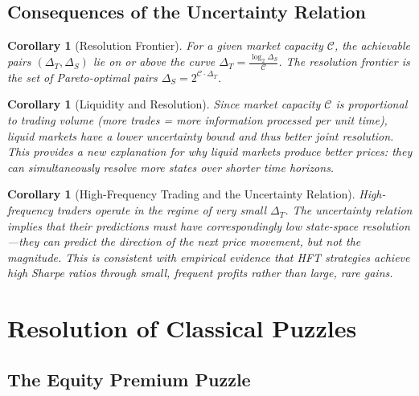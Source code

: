 \documentclass[12pt,a4paper]{article}
\newtheorem{corollary}[theorem]{Corollary}
\theoremstyle{definition}
\begin{document}
\subsection{Consequences of the Uncertainty Relation}

\begin{corollary}[Resolution Frontier]\label{cor:resolution_frontier}
For a given market capacity $\mathcal{C}$, the achievable pairs $(\Delta_T, \Delta_S)$ lie on or above the curve $\Delta_T = \frac{\log_2 \Delta_S}{\mathcal{C}}$. The \emph{resolution frontier} is the set of Pareto-optimal pairs $\Delta_S = 2^{\mathcal{C} \cdot \Delta_T}$.
\end{corollary}

\begin{corollary}[Liquidity and Resolution]\label{cor:liq_resolution}
Since market capacity $\mathcal{C}$ is proportional to trading volume (more trades = more information processed per unit time), liquid markets have a lower uncertainty bound and thus better joint resolution. This provides a new explanation for why liquid markets produce better prices: they can simultaneously resolve more states over shorter time horizons.
\end{corollary}

\begin{corollary}[High-Frequency Trading and the Uncertainty Relation]\label{cor:hft}
High-frequency traders operate in the regime of very small $\Delta_T$. The uncertainty relation implies that their predictions must have correspondingly low state-space resolution---they can predict the direction of the next price movement, but not the magnitude. This is consistent with empirical evidence that HFT strategies achieve high Sharpe ratios through small, frequent profits rather than large, rare gains.
\end{corollary}



\section{Resolution of Classical Puzzles}\label{sec:puzzles}

\subsection{The Equity Premium Puzzle}
\end{document}
